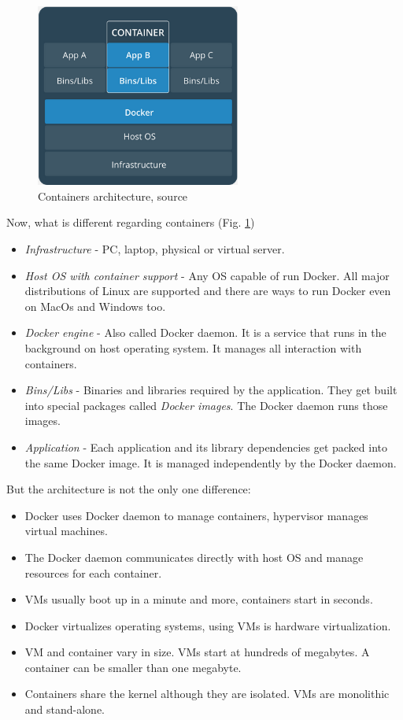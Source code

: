 \documentclass[12pt,a4paper]{article}
\begin{document}
\begin{figure}[h!]
\centering
\includegraphics[width=0.6\textwidth]{img/Docker_container}
\caption{Containers architecture, source \cite{Docker_docs}}
\label{fig:Docker_container}
\end{figure}

\noindent
Now, what is different regarding containers (Fig. \ref{fig:Docker_container})
\begin{itemize}
\item \textit{Infrastructure} - PC, laptop, physical or virtual server.
\item \textit{Host OS with container support} - Any OS capable of run Docker. All major distributions of Linux are supported and there are ways
to run Docker even on MacOs and Windows too.
\item \textit{Docker engine} - Also called Docker daemon. It is a service that runs in the background on host operating system. It manages all interaction with containers.
\item \textit{Bins/Libs} - Binaries and libraries required by the application. They get built into special packages called \textit{Docker images}.
The Docker daemon runs those images.
\item \textit{Application} - Each application and its library dependencies get packed into the same Docker image. It is managed independently by the Docker daemon. 
\end{itemize}

\noindent
But the architecture is not the only one difference:
\begin{itemize}
\item Docker uses Docker daemon to manage containers, hypervisor manages virtual machines.
\item The Docker daemon communicates directly with host OS and manage resources for each container.
\item VMs usually boot up in a minute and more, containers start in seconds.
\item Docker virtualizes operating systems, using VMs is hardware virtualization.
\item VM and container vary in size. VMs start at hundreds of megabytes. A container can be smaller than one megabyte.
\item Containers share the kernel although they are isolated. VMs are monolithic and stand-alone.
\end{itemize}
\end{document}
